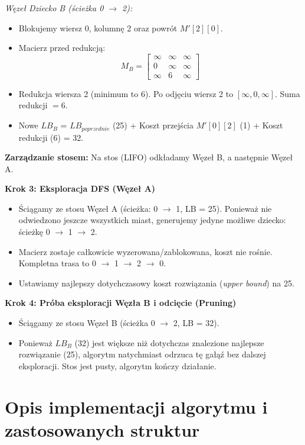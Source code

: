 \documentclass[12pt, a4paper]{article}
\begin{document}
\textit{Węzeł Dziecko B (ścieżka 0 $\rightarrow$ 2):}
\begin{itemize}
	\item Blokujemy wiersz 0, kolumnę 2 oraz powrót $M'[2][0]$.
	\item Macierz przed redukcją:
	$$ M_B = \begin{bmatrix} \infty & \infty & \infty \\ 0 & \infty & \infty \\ \infty & 6 & \infty \end{bmatrix} $$
	\item Redukcja wiersza 2 (minimum to 6). Po odjęciu wiersz 2 to $[\infty, 0, \infty]$. Suma redukcji $= 6$.
	\item Nowe $LB_B$ = $LB_{poprzednie}$ (25) + Koszt przejścia $M'[0][2]$ (1) + Koszt redukcji (6) = 32.
\end{itemize}
\textbf{Zarządzanie stosem:} Na stos (LIFO) odkładamy Węzeł B, a następnie Węzeł A.

\textbf{Krok 3: Eksploracja DFS (Węzeł A)}
\begin{itemize}
	\item Ściągamy ze stosu Węzeł A (ścieżka: 0 $\rightarrow$ 1, LB = 25). Ponieważ nie odwiedzono jeszcze wszystkich miast, generujemy jedyne możliwe dziecko: ścieżkę 0 $\rightarrow$ 1 $\rightarrow$ 2.
	\item Macierz zostaje całkowicie wyzerowana/zablokowana, koszt nie rośnie. Kompletna trasa to 0 $\rightarrow$ 1 $\rightarrow$ 2 $\rightarrow$ 0.
	\item Ustawiamy najlepszy dotychczasowy koszt rozwiązania (\textit{upper bound}) na 25.
\end{itemize}

\textbf{Krok 4: Próba eksploracji Węzła B i odcięcie (Pruning)}
\begin{itemize}
	\item Ściągamy ze stosu Węzeł B (ścieżka 0 $\rightarrow$ 2, LB = 32).
	\item Ponieważ $LB_B$ (32) jest większe niż dotychczas znalezione najlepsze rozwiązanie (25), algorytm natychmiast odrzuca tę gałąź bez dalszej eksploracji. Stos jest pusty, algorytm kończy działanie.
\end{itemize}


\section{Opis implementacji algorytmu i zastosowanych struktur}
\end{document}
